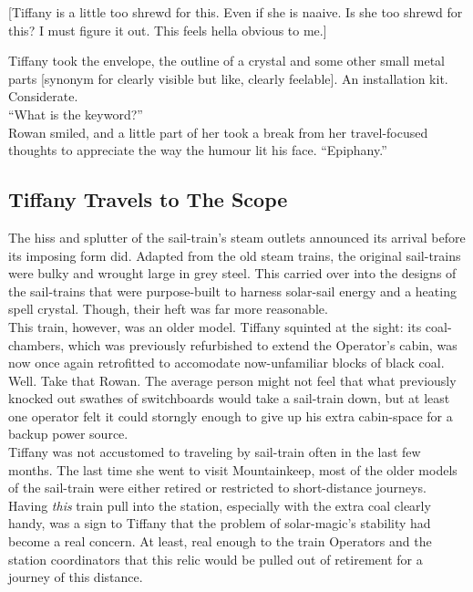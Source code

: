 [Tiffany is a little too shrewd for this. Even if she is naaive. Is she too shrewd for this? I must figure it out. This feels hella obvious to me.]

Tiffany took the envelope, the outline of a crystal and some other small metal parts [synonym for clearly visible but like, clearly feelable].
An installation kit.
Considerate.\\

``What is the keyword?''\\

Rowan smiled, and a little part of her took a break from her travel-focused thoughts to appreciate the way the humour lit his face.
``Epiphany.''

\subsection{Tiffany Travels to The Scope}

The hiss and splutter of the sail-train's steam outlets announced its arrival before its imposing form did.
Adapted from the old steam trains, the original sail-trains were bulky and wrought large in grey steel.
This carried over into the designs of the sail-trains that were purpose-built to harness solar-sail energy and a heating spell crystal.
Though, their heft was far more reasonable.\\

This train, however, was an older model.
Tiffany squinted at the sight: its coal-chambers, which was previously refurbished to extend the Operator's cabin, was now once again retrofitted to accomodate now-unfamiliar blocks of black coal.\\

Well. 
Take that Rowan.
The average person might not feel that what previously knocked out swathes of switchboards would take a sail-train down, but at least one operator felt it could storngly enough to give up his extra cabin-space for a backup power source.\\

Tiffany was not accustomed to traveling by sail-train often in the last few months.
The last time she went to visit Mountainkeep, most of the older models of the sail-train were either retired or restricted to short-distance journeys.
Having \textit{this} train pull into the station, especially with the extra coal clearly handy, was a sign to Tiffany that the problem of solar-magic's stability had become a real concern.
At least, real enough to the train Operators and the station coordinators that this relic would be pulled out of retirement for a journey of this distance.\\

